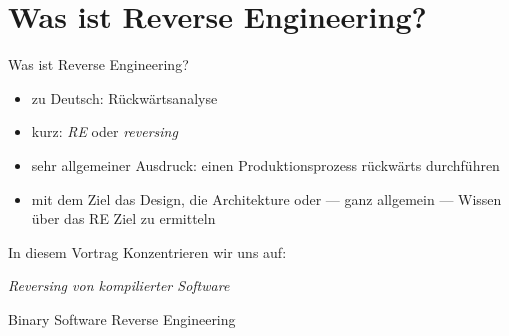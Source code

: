 \documentclass[aspectratio=169,handout]{beamer}
\begin{document}


\section{Was ist Reverse Engineering?}
\begin{frame}{Was ist Reverse Engineering?}
  \begin{itemize}
    \item zu Deutsch: Rückwärtsanalyse\pause
    \item kurz: \emph{RE} oder \emph{reversing}\pause
    \item sehr allgemeiner Ausdruck: \pause einen Produktionsprozess rückwärts durchführen\pause
    \item mit dem Ziel das Design, die Architekture oder --- ganz allgemein --- Wissen über das RE Ziel zu ermitteln
  \end{itemize}
  \pause
  \begin{alertblock}{In diesem Vortrag}\pause
    Konzentrieren wir uns auf:\\
    \begin{center}
      \emph{Reversing von kompilierter Software}
    \end{center}
  \end{alertblock}
\end{frame}

\begin{frame}{Binary Software Reverse Engineering}
  \begin{adjustbox}{max totalsize={.9\textwidth}{.7\textheight},center}
  \end{adjustbox}
\end{frame}
\end{document}
